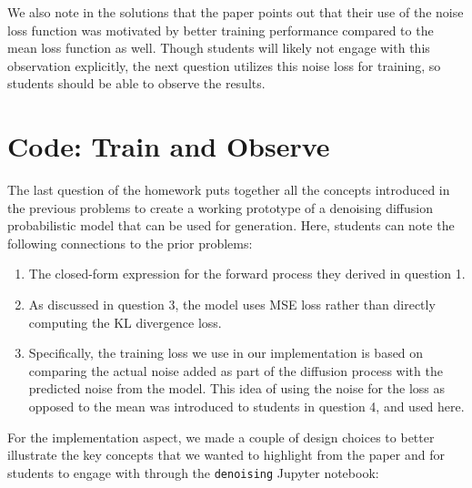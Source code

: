 \documentclass{article}
\begin{document}
We also note in the solutions that the paper points out that their use of the noise loss function was motivated by better training performance compared to the mean loss function as well. Though students will likely not engage with this observation explicitly, the next question utilizes this noise loss for training, so students should be able to observe the results.

\section{Code: Train and Observe}

The last question of the homework puts together all the concepts introduced in the previous problems to create a working prototype of a denoising diffusion probabilistic model that can be used for generation.
Here, students can note the following connections to the prior problems:

\begin{enumerate}
    \item The closed-form expression for the forward process they derived in question 1.
    
    \item As discussed in question 3, the model uses MSE loss rather than directly computing the KL divergence loss.

    \item Specifically, the training loss we use in our implementation is based on comparing the actual noise added as part of the diffusion process with the predicted noise from the model. This idea of using the noise for the loss as opposed to the mean was introduced to students in question 4, and used here.

\end{enumerate}

For the implementation aspect, we made a couple of design choices to better illustrate the key concepts that we wanted to highlight from the paper and for students to engage with through the \verb|denoising| Jupyter notebook:
\end{document}
